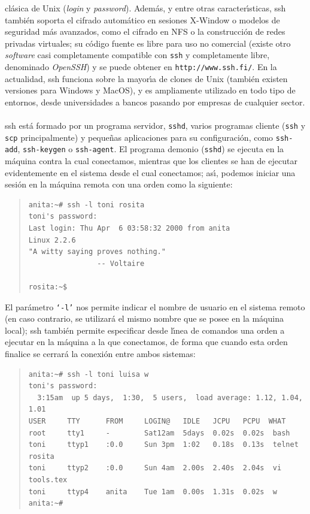 cl\'asica de Unix ({\it login} y {\it password}). Adem\'as, y entre otras 
caracter\'{\i}sticas, {\sc ssh} tambi\'en soporta el cifrado autom\'atico 
en sesiones X-Window o modelos de seguridad m\'as avanzados, como el cifrado en
NFS o la construcci\'on de redes privadas virtuales; su c\'odigo fuente es
libre para uso no comercial (existe otro {\it software} casi completamente 
compatible con {\tt ssh} y completamente libre, denominado {\it OpenSSH}) y se 
puede obtener en {\tt http://www.ssh.fi/}. En la actualidad, {\sc
ssh} funciona sobre la mayor\'{\i}a de clones de Unix (tambi\'en existen 
versiones para Windows y MacOS), y es ampliamente utilizado en todo tipo de 
entornos, desde universidades a bancos pasando por empresas de cualquier 
sector.\\
\\{\sc ssh} est\'a formado por un programa servidor, {\tt sshd}, varios 
programas cliente ({\tt ssh} y {\tt scp} principalmente) y peque\~nas 
aplicaciones para su
configuraci\'on, como {\tt ssh-add}, {\tt ssh-keygen} o {\tt ssh-agent}. El 
programa demonio
({\tt sshd}) se ejecuta en la m\'aquina contra la cual conectamos, mientras
que los clientes se han de ejecutar evidentemente en el sistema desde el cual
conectamos; as\'{\i}, podemos iniciar una sesi\'on en la m\'aquina remota con
una orden como la siguiente:
\begin{quote}
\begin{verbatim}
anita:~# ssh -l toni rosita
toni's password: 
Last login: Thu Apr  6 03:58:32 2000 from anita
Linux 2.2.6
"A witty saying proves nothing."
                -- Voltaire

rosita:~$
\end{verbatim}
\end{quote}
El par\'ametro {\tt `-l'} nos permite indicar el nombre de usuario en el
sistema remoto (en caso contrario, se utilizar\'a el mismo nombre que se posee
en la m\'aquina local); {\sc ssh} tambi\'en permite especificar desde 
l\'{\i}nea de comandos una orden a ejecutar en la m\'aquina a la que 
conectamos, de forma que cuando esta orden finalice se cerrar\'a la conexi\'on 
entre ambos sistemas:
\begin{quote}
\begin{verbatim}
anita:~# ssh -l toni luisa w
toni's password:
  3:15am  up 5 days,  1:30,  5 users,  load average: 1.12, 1.04, 1.01
USER     TTY      FROM     LOGIN@   IDLE   JCPU   PCPU  WHAT
root     tty1     -        Sat12am  5days  0.02s  0.02s  bash           
toni     ttyp1    :0.0     Sun 3pm  1:02   0.18s  0.13s  telnet rosita 
toni     ttyp2    :0.0     Sun 4am  2.00s  2.40s  2.04s  vi tools.tex 
toni     ttyp4    anita    Tue 1am  0.00s  1.31s  0.02s  w 
anita:~#
\end{verbatim}
\end{quote}
